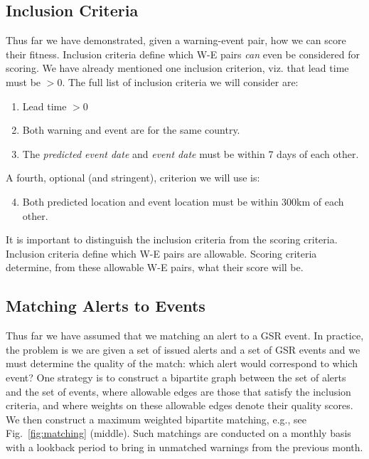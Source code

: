 \subsection{Inclusion Criteria}
Thus far we have demonstrated, given a warning-event pair, how we can
score their fitness. Inclusion criteria define which W-E pairs {\it can}
even be considered for scoring. We have already mentioned one inclusion
criterion, viz. that lead time must be $> 0$. The full list of inclusion
criteria we will consider are:
\begin{enumerate}
\item Lead time $> 0$
\item Both warning and event are for the same country.
\item The {\it predicted event date} and {\it event date} must be
within 7 days of each other.
\end{enumerate}
A fourth, optional (and stringent), criterion we will use is:
\begin{enumerate}
  \setcounter{enumi}{3}
  \item Both predicted location and event location must be within 300km of
each other.
\end{enumerate}
It is important to distinguish the inclusion criteria from the scoring
criteria. Inclusion criteria define which W-E pairs are allowable.
Scoring criteria determine, from these allowable W-E pairs, what their
score will be.

\subsection{Matching Alerts to Events}
Thus far we have assumed that we matching an alert to a GSR event. In
practice, the problem is we are given a set of issued alerts  and a set
of GSR events and we must determine the quality of the match: which
alert would correspond to which event? One strategy is to construct
a bipartite graph between the set of alerts and the set of events,
where allowable edges are those that satisfy the inclusion criteria, and
where weights on these allowable edges denote their quality scores.
We then construct
a maximum weighted bipartite matching, e.g., see
Fig.~\ref{fig:matching} (middle). Such matchings are conducted on a monthly basis
with a lookback period to bring in unmatched warnings from the previous month.

